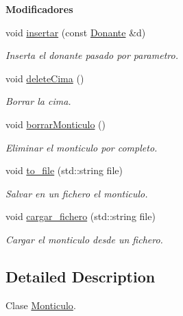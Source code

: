 \begin{Indent}{\bf Modificadores}\par
\begin{DoxyCompactItemize}
\item 
void \hyperlink{classed_1_1Monticulo_a573f0043ee88445d6b6a61d988703410}{insertar} (const \hyperlink{classed_1_1Donante}{Donante} \&d)
\begin{DoxyCompactList}\small\item\em Inserta el donante pasado por parametro. \end{DoxyCompactList}\item 
void \hyperlink{classed_1_1Monticulo_a34628b3b1210e6d4f5e240ef0e0c0a42}{delete\+Cima} ()\hypertarget{classed_1_1Monticulo_a34628b3b1210e6d4f5e240ef0e0c0a42}{}\label{classed_1_1Monticulo_a34628b3b1210e6d4f5e240ef0e0c0a42}

\begin{DoxyCompactList}\small\item\em Borrar la cima. \end{DoxyCompactList}\item 
void \hyperlink{classed_1_1Monticulo_a167e014da42bf6cb97834feb9cb26087}{borrar\+Monticulo} ()\hypertarget{classed_1_1Monticulo_a167e014da42bf6cb97834feb9cb26087}{}\label{classed_1_1Monticulo_a167e014da42bf6cb97834feb9cb26087}

\begin{DoxyCompactList}\small\item\em Eliminar el monticulo por completo. \end{DoxyCompactList}\item 
void \hyperlink{classed_1_1Monticulo_a476cdc164df729a28969054120dd7fb6}{to\+\_\+file} (std\+::string file)
\begin{DoxyCompactList}\small\item\em Salvar en un fichero el monticulo. \end{DoxyCompactList}\item 
void \hyperlink{classed_1_1Monticulo_a036c69560508db95a98ae1e666c40ca4}{cargar\+\_\+fichero} (std\+::string file)
\begin{DoxyCompactList}\small\item\em Cargar el monticulo desde un fichero. \end{DoxyCompactList}\end{DoxyCompactItemize}
\end{Indent}


\subsection{Detailed Description}
Clase \hyperlink{classed_1_1Monticulo}{Monticulo}. 

